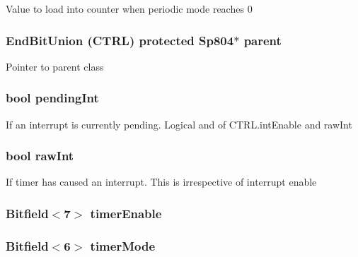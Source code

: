 \label{classSp804_1_1Timer_a21dfc3b5f848baeba0be506b5b289485}
Value to load into counter when periodic mode reaches 0 \hypertarget{classSp804_1_1Timer_a0e5173aee1e61e68810b199b498223b8}{
\subsubsection[{parent}]{\setlength{\rightskip}{0pt plus 5cm}EndBitUnion (CTRL) protected {\bf Sp804}$\ast$ {\bf parent}}}
\label{classSp804_1_1Timer_a0e5173aee1e61e68810b199b498223b8}
Pointer to parent class \hypertarget{classSp804_1_1Timer_af3f4acf42e0f2210078e61204edbab91}{
\subsubsection[{pendingInt}]{\setlength{\rightskip}{0pt plus 5cm}bool {\bf pendingInt}}}
\label{classSp804_1_1Timer_af3f4acf42e0f2210078e61204edbab91}
If an interrupt is currently pending. Logical and of CTRL.intEnable and rawInt \hypertarget{classSp804_1_1Timer_a5f9476d82d9f414dccd9b49558d459bc}{
\subsubsection[{rawInt}]{\setlength{\rightskip}{0pt plus 5cm}bool {\bf rawInt}}}
\label{classSp804_1_1Timer_a5f9476d82d9f414dccd9b49558d459bc}
If timer has caused an interrupt. This is irrespective of interrupt enable \hypertarget{classSp804_1_1Timer_ab193f92c9325928a8fbfe941540db1a0}{
\subsubsection[{timerEnable}]{\setlength{\rightskip}{0pt plus 5cm}Bitfield$<$7$>$ {\bf timerEnable}}}
\label{classSp804_1_1Timer_ab193f92c9325928a8fbfe941540db1a0}
\hypertarget{classSp804_1_1Timer_aa71cecfa28f348244319827543df9e18}{
\subsubsection[{timerMode}]{\setlength{\rightskip}{0pt plus 5cm}Bitfield$<$6$>$ {\bf timerMode}}}
